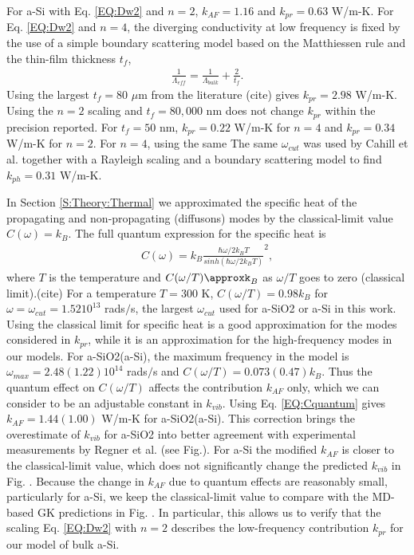 \documentclass[aps,prb,twocolumn,superscriptaddress,footinbib,amsmath,amssymb,floatfix]{revtex4}
\begin{document}
For a-Si with Eq. \eqref{EQ:Dw2} and $n=2$, 
$k_{AF} = 1.16$ and $k_{pr} = 0.63$ W/m-K. For Eq. \eqref{EQ:Dw2} 
and $n=4$, the 
diverging conductivity at low frequency is fixed by the 
use of a simple boundary scattering model based on the Matthiessen 
rule and the thin-film thickness $t_f$,\cite{sellan_cross-plane_2010} 
\begin{equation}\label{EQ:LambdaMatth}
\begin{split}
\frac{1}{\Lambda_{eff}} = \frac{1}{\Lambda_{bulk}} + 
\frac{2}{t_f}.
\end{split}
\end{equation}
Using the largest $t_f = 80$ $\mu$m from the literature
(cite) gives $k_{pr} = 2.98$ W/m-K. 
Using the $n=2$ scaling and $t_f = 80,000$ nm does not change 
$k_{pr}$ within the precision reported. For $t_f = 50$ nm, 
$k_{pr} = 0.22$ W/m-K for $n=4$ 
and $k_{pr} = 0.34$ W/m-K for $n=2$. For $n=4$, using the 
same 
The same $\omega_{cut}$ was used by Cahill et al. 
together with a Rayleigh scaling and a boundary scattering model to 
find $k_{ph} = 0.31$ W/m-K.\cite{cahill_thermal_1994} 

In Section \ref{S:Theory:Thermal} we approximated the specific heat 
of the propagating 
and non-propagating (diffusons) modes by the classical-limit 
value $C(\omega) = k_{B}$.    
The full quantum expression for the specific heat is
\begin{equation}\label{EQ:Cquantum}
\begin{split}
C(\omega) = k_{B}\frac{\hbar\omega/2k_{B}T}{sinh(\hbar\omega/2k_{B}T)}^2,
\end{split}
\end{equation}
where $T$ is the temperature and $C(\omega/T)\approxk_{B}$ as $\omega/T$ 
goes to zero (classical limit).(cite) 
For a temperature $T=300$ K, $C(\omega/T) = 0.98 k_{B}$ 
for $\omega = \omega_{cut} = 1.52 10^{13}$ rads$/$s, the largest 
$\omega_{cut}$ used for a-SiO2 or a-Si in this work. Using the 
classical limit for specific heat is a good approximation for the 
modes considered in $k_{pr}$, while it is an approximation for the 
high-frequency modes in our models. For a-SiO2(a-Si), the maximum 
frequency in the model is 
$\omega_{max} = 2.48 (1.22) 10^{14}$ rads$/$s and 
$C(\omega/T) = 0.073 (0.47) k_{B}$. Thus the quantum effect on 
$C(\omega/T)$ affects the 
contribution $k_{AF}$ only, which we can consider to be an 
adjustable constant in $k_{vib}$. Using Eq. \eqref{EQ:Cquantum} gives 
$k_{AF} = 1.44 (1.00) $ W/m-K   
for a-SiO2(a-Si). This correction brings 
the overestimate of $k_{vib}$ for a-SiO2 into better 
agreement with experimental measurements by Regner et al. (see Fig.). 
For a-Si the modified $k_{AF}$ is closer to the classical-limit value, 
which does not significantly change the predicted $k_{vib}$ in Fig. . 
Because the change in $k_{AF}$ due to quantum effects are reasonably 
small, particularly for a-Si, 
we keep the classical-limit value to compare with the MD-based 
GK predictions in Fig. .  In particular, this allows us to verify that 
the scaling Eq. \eqref{EQ:Dw2} with $n=2$ describes the low-frequency 
contribution $k_{pr}$ for our model of bulk a-Si. 
\end{document}
